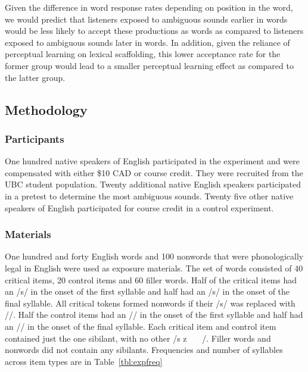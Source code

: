 Given the difference in word response rates depending on position in the word, we would predict that listeners exposed to ambiguous sounds earlier in words would be less likely to accept these productions as words as compared to listeners exposed to ambiguous sounds later in words.  In addition, given the reliance of perceptual learning on lexical scaffolding, this lower acceptance rate for the former group would lead to a smaller perceptual learning effect as compared to the latter group.

\subsection{Methodology}

\subsubsection{Participants}

One hundred native speakers of English participated in the experiment and were compensated with either \$10 CAD or course credit. 
They were recruited from the UBC student population.  
Twenty additional native English speakers participated in a pretest to determine the most ambiguous sounds.  
Twenty five other native speakers of English participated for course credit in a control experiment.

\subsubsection{Materials}

One hundred and forty English words and 100 nonwords that were phonologically legal in English were used as exposure materials.  
The set of words consisted of 40 critical items, 20 control items and 60 filler words.  
Half of the critical items had an /s/ in the onset of the first syllable and half had an /s/ in the onset of the final syllable.  
All critical tokens formed nonwords if their /s/ was replaced with /\textesh/. Half the control items had an /\textesh/ in the onset of the first syllable and half had an /\textesh/ in the onset of the final syllable.  
Each critical item and control item contained just the one sibilant, with no other /s z \textesh\ \textyogh\ \textteshlig\  \textdyoghlig/.  
Filler words and nonwords did not contain any sibilants.  
Frequencies and number of syllables across item types are in Table~\ref{tbl:expfreq}

